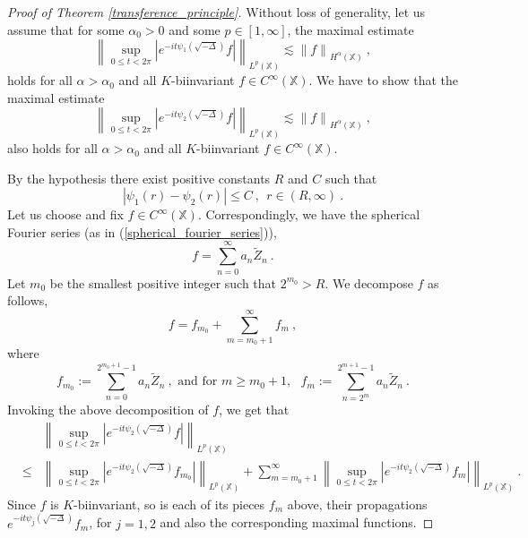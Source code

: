 \documentclass[10pt,a4paper]{amsart}
\newcommand{\X}{\mathbb X}%
\begin{document}
\begin{proof}[Proof of Theorem \ref{transference_principle}]
Without loss of generality, let us assume that for some $\alpha_0>0$ and some $p \in [1,\infty]$, the maximal estimate 
\begin{equation} \label{transference_pf_eq1}
\left\|\sup_{0 \le t < 2\pi} \left|e^{-it\psi_1\left(\sqrt{-\Delta}\right)} f \right|\right\|_{L^p(\X)} \lesssim {\|f\|}_{H^\alpha(\X)}\:,
\end{equation}
holds for all $\alpha >\alpha_0$ and all $K$-biinvariant $f \in C^\infty(\X)$. We have to show that the maximal estimate 
\begin{equation} \label{transference_pf_eq2}
\left\|\sup_{0 \le t < 2\pi} \left|e^{-it\psi_2\left(\sqrt{-\Delta}\right)} f \right|\right\|_{L^p(\X)} \lesssim {\|f\|}_{H^\alpha(\X)}\:,
\end{equation}
also holds for all $\alpha >\alpha_0$ and all $K$-biinvariant $f \in C^\infty(\X)$.

By the hypothesis there exist positive constants $R$ and $C$ such that 
\begin{equation} \label{transference_pf_eq3}
\left|\psi_1(r)-\psi_2(r)\right| \le C\:,\:\: r \in (R, \infty)\:.
\end{equation} 
Let us choose and fix $f \in C^\infty(\X)$. Correspondingly, we have the spherical Fourier series (as in (\ref{spherical_fourier_series})),
\begin{equation*}
f = \sum_{n=0}^\infty a_n \tilde{Z}_n\:.
\end{equation*}
Let $m_0$ be the smallest positive integer such that $2^{m_0}> R$. We decompose $f$ as follows,
\begin{equation*} 
f=f_{m_0} + \sum_{m=m_0+1}^\infty f_m\:,
\end{equation*}
where 
\begin{equation*}
f_{m_0}:= \sum_{n=0}^{2^{m_0+1}-1} a_n \tilde{Z}_n \:, \text{ and for } m \ge m_0+1,\:\:\: f_m :=  \sum_{n=2^m}^{2^{m+1}-1} a_n \tilde{Z}_n\:.
\end{equation*}
Invoking the above decomposition of $f$, we get that
\begin{eqnarray} \label{transference_pf_eq4}
&&\left\|\sup_{0 \le t < 2\pi} \left|e^{-it\psi_2\left(\sqrt{-\Delta}\right)} f \right|\right\|_{L^p(\X)}\nonumber\\
 & \le & \left\|\sup_{0 \le t < 2\pi} \left|e^{-it\psi_2\left(\sqrt{-\Delta}\right)} f_{m_0} \right|\right\|_{L^p(\X)} + \sum_{m=m_0+1}^\infty \left\|\sup_{0 \le t < 2\pi} \left|e^{-it\psi_2\left(\sqrt{-\Delta}\right)} f_m \right|\right\|_{L^p(\X)}\:.
\end{eqnarray}
Since $f$ is $K$-biinvariant, so is each of its pieces $f_m$ above, their propagations $e^{-it\psi_j\left(\sqrt{-\Delta}\right)} f_m$, for $j=1,2$ and also the corresponding maximal functions.  


\end{proof}
\end{document}
